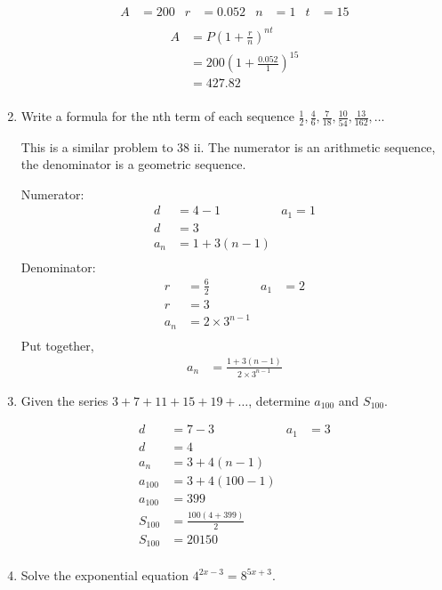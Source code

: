 \documentclass[paper=a4, fontsize=11pt]{scrartcl}
\begin{document}
\begin{enumerate}[resume]
    \begin{align*}
        A&=200&r&=0.052&n&=1&t&=15\\
    \end{align*}
    \begin{align*}
        A&=P(1+\frac{r}{n})^{n t}\\
        &=200(1+\frac{0.052}{1})^{15}\\
        &=427.82\\
    \end{align*}
    \item Write a formula for the nth term of each sequence $\frac{1}{2},\frac{4}{6},\frac{7}{18},\frac{10}{54},\frac{13}{162},\ldots$
    
    This is a similar problem to 38 ii. The numerator is an arithmetic sequence, the denominator is a geometric sequence.

    Numerator:
    \begin{align*}
        d&=4-1&a_1=1\\
        d&=3\\
        a_n&=1+3(n-1)\\
    \end{align*}
    Denominator: 
    \begin{align*}
        r&=\frac{6}{2}&a_1&=2\\
        r&=3\\
        a_n&=2\times3^{n-1}\\
    \end{align*}
    Put together,
    \begin{align*}
        a_n&=\frac{1+3(n-1)}{2\times3^{n-1}}
    \end{align*}
    \item Given the series $3+7+11+15+19+\ldots$, determine $a_{100}$ and $S_{100}$.
    
    \begin{align}
        d&=7-3&a_1&=3\\
        d&=4\\
        a_n&=3+4(n-1)\\
        a_{100}&=3+4(100-1)\\
        a_{100}&=399\\
        S_{100}&=\frac{100(4+399)}{2}\\
        S_{100}&=20150\\
    \end{align}

    \item Solve the exponential equation $4^{2x-3}=8^{5x+3}$.
    

\end{enumerate}
\end{document}
